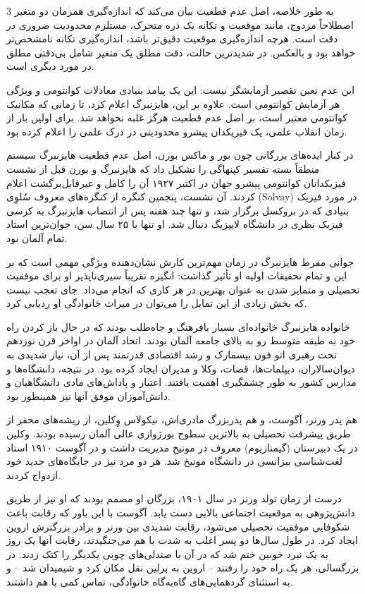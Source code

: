 \documentclass[11pt,a4paper]{article}
\begin{document}
\begin{multicols}{3}
به طور خلاصه، اصل عدم قطعیت بیان می‌کند که اندازه‌گیری همزمان دو متغیر اصطلاحاً مزدوج، مانند موقعیت و تکانه یک ذره متحرک، مستلزم محدودیت ضروری در دقت است. هرچه اندازه‌گیری موقعیت دقیق‌تر باشد، اندازه‌گیری تکانه نامشخص‌تر خواهد بود و بالعکس. در شدیدترین حالت، دقت مطلق یک متغیر شامل بی‌دقتی مطلق در مورد دیگری است.

این عدم تعین تقصیر آزمایشگر نیست: این یک پیامد بنیادی معادلات کوانتومی و ویژگی هر آزمایش کوانتومی است. علاوه بر این، هایزنبرگ اعلام کرد، تا زمانی که مکانیک کوانتومی معتبر است، بر اصل عدم قطعیت هرگز غلبه نخواهد شد. برای اولین بار از زمان انقلاب علمی، یک فیزیکدان پیشرو محدودیتی در درک علمی را اعلام کرده بود.

در کنار ایده‌های بزرگانی چون بور و ماکس بورن، اصل عدم قطعیت هایزنبرگ سیستم منطقاً بسته تفسیر کپنهاگی را تشکیل داد که هایزنبرگ و بورن قبل از نشست فیزیکدانان کوانتومی پیشرو جهان در اکتبر ۱۹۲۷ آن را کامل و غیرقابل‌برگشت اعلام کردند. آن نشست، پنجمین کنگره از کنگره‌های معروف سُلوِی (Solvay) در مورد فیزیک بنیادی که در بروکسل برگزار شد، و تنها چند هفته پس از انتصاب هایزنبرگ به کرسی فیزیک نظری در دانشگاه لایپزیگ دنبال شد. او تنها با ۲۵ سال سن، جوان‌ترین استاد تمام آلمان بود.

\vspace{1em}
\noindent جوانی مفرط هایزنبرگ در زمان مهم‌ترین کارش نشان‌دهنده ویژگی مهمی است که بر این و تمام تحقیقات اولیه او تأثیر گذاشت: انگیزه تقریباً سیری‌ناپذیر او برای موفقیت تحصیلی و متمایز شدن به عنوان بهترین در هر کاری که انجام می‌داد. جای تعجب نیست که بخش زیادی از این تمایل را می‌توان در میراث خانوادگی او ردیابی کرد.

خانواده هایزنبرگ خانواده‌ای بسیار بافرهنگ و جاه‌طلب بودند که در حال باز کردن راه خود به طبقه متوسط رو به بالای جامعه آلمان بودند. اتحاد آلمان در اواخر قرن نوزدهم تحت رهبری اتو فون بیسمارک و رشد اقتصادی قدرتمند پس از آن، نیاز شدیدی به دیوان‌سالاران، دیپلمات‌ها، قضات، وکلا و مدیران ایجاد کرده بود. در نتیجه، دانشگاه‌ها و مدارس کشور به طور چشمگیری اهمیت یافتند. اعتبار و پاداش‌های مادی دانشگاهیان و دانش‌آموزان موفق آنها نیز همینطور بود.

هم پدر ورنر، آگوست، و هم پدربزرگ مادری‌اش، نیکولاس وِکلین، از ریشه‌های محقر از طریق پیشرفت تحصیلی به بالاترین سطوح بورژوازی عالی آلمان رسیده بودند. وکلین در یک دبیرستان (گیمنازیوم) معروف در مونیخ مدیریت داشت و در آگوست ۱۹۱۰ استاد لغت‌شناسی بیزانسی در دانشگاه مونیخ شد. هر دو مرد نیز در جایگاه‌های جدید خود ازدواج کردند.

درست از زمان تولد ورنر در سال ۱۹۰۱، بزرگان او مصمم بودند که او نیز از طریق دانش‌پژوهی به موقعیت اجتماعی بالایی دست یابد. آگوست با این باور که رقابت باعث شکوفایی موفقیت تحصیلی می‌شود، رقابت شدیدی بین ورنر و برادر بزرگترش اروین ایجاد کرد. در طول سال‌ها دو پسر اغلب به شدت با هم می‌جنگیدند، رقابت آنها یک روز به یک نبرد خونین ختم شد که در آن با صندلی‌های چوبی یکدیگر را کتک زدند. در بزرگسالی، هر یک راه خود را رفتند -- اروین به برلین نقل مکان کرد و شیمیدان شد -- و به استثنای گردهمایی‌های گاه‌به‌گاه خانوادگی، تماس کمی با هم داشتند.


\end{multicols}
\end{document}
